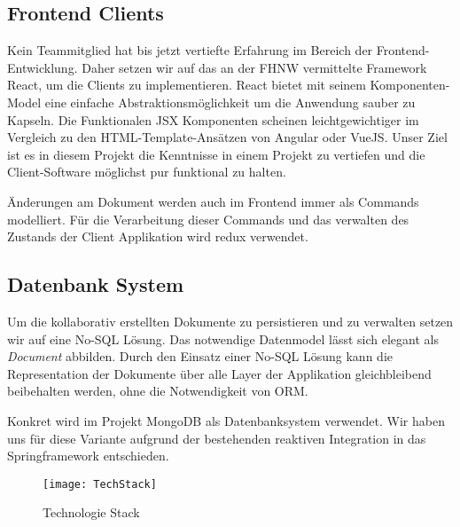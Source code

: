 \subsection{Frontend Clients}
Kein Teammitglied hat bis jetzt vertiefte Erfahrung im Bereich der Frontend-Entwicklung.
Daher setzen wir auf das an der FHNW vermittelte Framework React, um die Clients zu implementieren.
React bietet mit seinem Komponenten-Model eine einfache Abstraktionsmöglichkeit um die Anwendung sauber zu Kapseln.
Die Funktionalen JSX Komponenten scheinen leichtgewichtiger im Vergleich zu den HTML-Template-Ansätzen von Angular oder VueJS\@.
Unser Ziel ist es in diesem Projekt die Kenntnisse in einem Projekt zu vertiefen und die Client-Software möglichst pur funktional zu halten.

Änderungen am Dokument werden auch im Frontend immer als Commands modelliert.
Für die Verarbeitung dieser Commands und das verwalten des Zustands der Client Applikation wird redux verwendet.

\subsection{Datenbank System}
Um die kollaborativ erstellten Dokumente zu persistieren und zu verwalten setzen wir auf eine No-SQL Lösung.
Das notwendige Datenmodel lässt sich elegant als \emph{Document} abbilden.
Durch den Einsatz einer No-SQL Lösung kann die Representation der Dokumente über alle Layer der Applikation gleichbleibend beibehalten werden,
ohne die Notwendigkeit von ORM\@.

Konkret wird im Projekt MongoDB als Datenbanksystem verwendet.
Wir haben uns für diese Variante aufgrund der bestehenden reaktiven Integration in das Springframework entschieden.


\begin{figure}
    \texttt{[image: TechStack]}
    \caption{Technologie Stack}
\end{figure}
